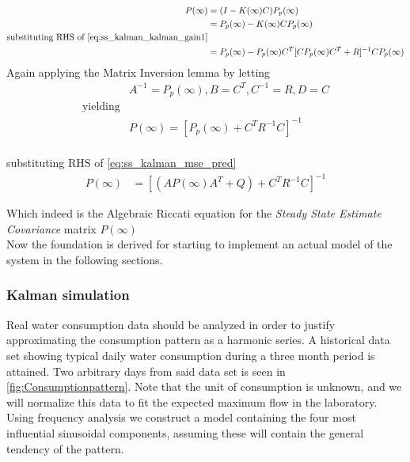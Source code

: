 \begin{equation}
	\begin{split}\label{eq:ss_kalman_udledning5}
	 	{P}(\infty) 	& = ({I} - {K}(\infty) {C}) {P}_p(\infty) \\ %
		& = {P}_p(\infty) - {K}(\infty) {C}{P}_p(\infty) \\
		\text{substituting RHS of \cref{eq:ss_kalman_kalman_gain1}} \\
		& = {P}_p(\infty) - {P}_p(\infty) {C}^T [{C} {P}_p	(\infty) {C}^T + {R}]^{-1}{C}{P}_p(\infty) \\
	\end{split}
\end{equation}
Again applying the Matrix Inversion lemma by letting
\begin{equation}
	\begin{split}\label{eq:ss_kalman_udledning5}
		&{A}^{-1} = {P}_p(\infty), {B} = {C}^T, {C}^{-1} = {R}, {D} = {C} \\
		\text{yielding} \\
		&{P}(\infty) = [{P}_p(\infty) + {C}^T{R}^{-1}{C}]^{-1} \\ 
	\end{split}
\end{equation}     

substituting RHS of \cref{eq:ss_kalman_mse_pred}
\begin{align}
		{P}(\infty) & = [({A}{P}(\infty){A}^T + {Q}) + {C}^T{R}^{-1}{C}]^{-1}  \label{eq:ss_kalman_udledning6}
\end{align}

Which indeed is the Algebraic Riccati equation for the \textit{Steady State Estimate Covariance} matrix ${P}(\infty)$\\
Now the foundation is derived for starting to implement an actual model of the system in the following sections.

\subsubsection{Kalman simulation}
Real water consumption data should be analyzed in order to justify approximating the consumption pattern as a harmonic series. A historical data set showing typical daily water consumption during a three month period is attained. Two arbitrary days from said data set is seen in \cref{fig:Consumptionpattern}. Note that the unit of consumption is unknown, and we will normalize this data to fit the expected maximum flow in the laboratory.  Using frequency analysis we construct a model containing the four most influential sinusoidal components, assuming these will contain the general tendency of the pattern.

